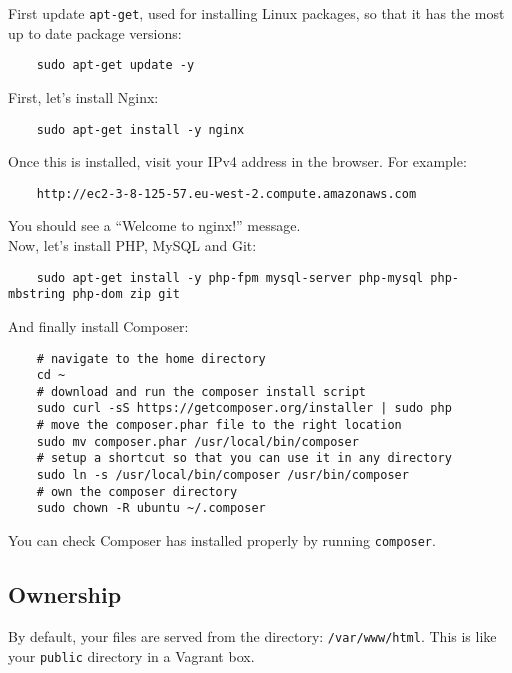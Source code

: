 First update \texttt{apt-get}, used for installing Linux packages, so that it has the most up to date package versions:

\begin{verbatim}
    sudo apt-get update -y
\end{verbatim}

First, let's install Nginx:

\begin{verbatim}
    sudo apt-get install -y nginx
\end{verbatim}

Once this is installed, visit your IPv4 address in the browser. For example:

\begin{verbatim}
    http://ec2-3-8-125-57.eu-west-2.compute.amazonaws.com
\end{verbatim}

You should see a ``Welcome to nginx!'' message.
\\

Now, let's install PHP,  MySQL and Git:

\begin{verbatim}
    sudo apt-get install -y php-fpm mysql-server php-mysql php-mbstring php-dom zip git
\end{verbatim}

And finally install Composer:

\begin{verbatim}
    # navigate to the home directory
    cd ~
    # download and run the composer install script
    sudo curl -sS https://getcomposer.org/installer | sudo php
    # move the composer.phar file to the right location
    sudo mv composer.phar /usr/local/bin/composer
    # setup a shortcut so that you can use it in any directory
    sudo ln -s /usr/local/bin/composer /usr/bin/composer
    # own the composer directory
    sudo chown -R ubuntu ~/.composer
\end{verbatim}

You can check Composer has installed properly by running \texttt{composer}.


\subsection{Ownership}

By default, your files are served from the directory: \texttt{/var/www/html}. This is like your \texttt{public} directory in a Vagrant box.
\\

